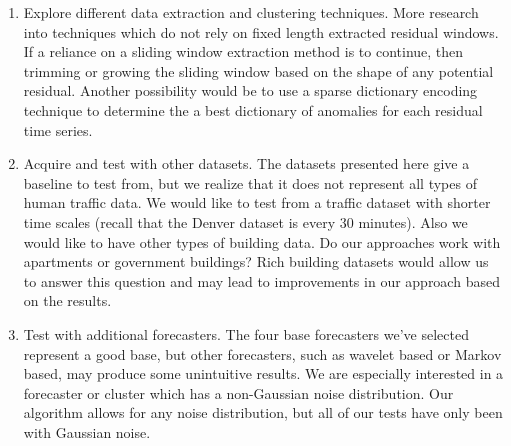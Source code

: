 \begin{enumerate}
	\item Explore different data extraction and clustering techniques.  More research into techniques which do not rely on fixed length extracted residual windows.  If a reliance on a sliding window extraction method is to continue, then trimming or growing the sliding window based on the shape of any potential residual.  Another possibility would be to use a sparse dictionary encoding technique to determine the a best dictionary of anomalies for each residual time series.
	
	\item Acquire and test with other datasets.  The datasets presented here give a baseline to test from, but we realize that it does not represent all types of human traffic data.  We would like to test from a traffic dataset with shorter time scales (recall that the Denver dataset is every 30 minutes).  Also we would like to have other types of building data.  Do our approaches work with apartments or government buildings?  Rich building datasets would allow us to answer this question and may lead to improvements in our approach based on the results.
	
	\item Test with additional forecasters.  The four base forecasters we've selected represent a good base, but other forecasters, such as wavelet based or Markov based, may produce some unintuitive results.  We are especially interested in a forecaster or cluster which has a non-Gaussian noise distribution.  Our algorithm allows for any noise distribution, but all of our tests have only been with Gaussian noise.
\end{enumerate}


